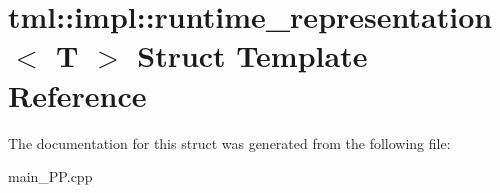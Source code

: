 \hypertarget{structtml_1_1impl_1_1runtime__representation}{\section{tml\+:\+:impl\+:\+:runtime\+\_\+representation$<$ T $>$ Struct Template Reference}
\label{structtml_1_1impl_1_1runtime__representation}
}


The documentation for this struct was generated from the following file\+:\begin{DoxyCompactItemize}
\item 
main\+\_\+\+P\+P.\+cpp\end{DoxyCompactItemize}
